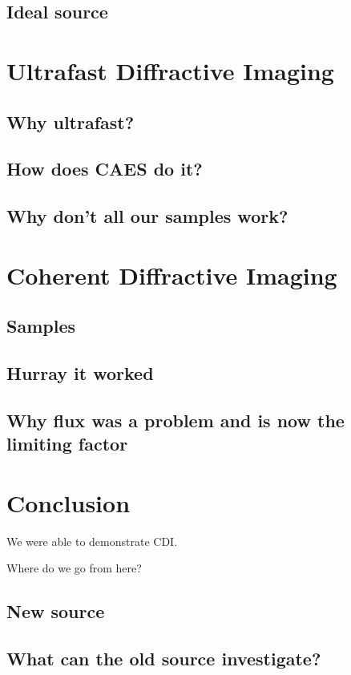 \section{Ideal source}


\chapter{Ultrafast Diffractive Imaging}

\section{Why ultrafast?}

\section{How does CAES do it?}

\section{Why don't all our samples work?}


\chapter{Coherent Diffractive Imaging}

\section{Samples}

\section{Hurray it worked}

\section{Why flux was a problem and is now the limiting factor}



\chapter{Conclusion}

We were able to demonstrate CDI.

Where do we go from here?

\section{New source}

\section{What can the old source investigate?}


